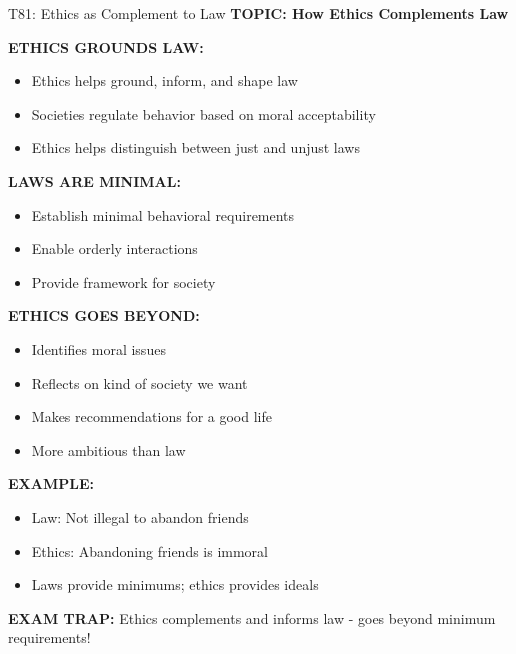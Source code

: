 \documentclass[8pt]{beamer}
\begin{document}
	\begin{frame}{T81: Ethics as Complement to Law}
		\fontsize{6.5}{7.5}\selectfont
		\textbf{TOPIC: How Ethics Complements Law}
		
		\vspace{0.1cm}
		\textbf{ETHICS GROUNDS LAW:}
		\begin{itemize}
			\item Ethics helps ground, inform, and shape law
			\item Societies regulate behavior based on moral acceptability
			\item Ethics helps distinguish between just and unjust laws
		\end{itemize}
		
		\vspace{0.1cm}
		\textbf{LAWS ARE MINIMAL:}
		\begin{itemize}
			\item Establish minimal behavioral requirements
			\item Enable orderly interactions
			\item Provide framework for society
		\end{itemize}
		
		\vspace{0.1cm}
		\textbf{ETHICS GOES BEYOND:}
		\begin{itemize}
			\item Identifies moral issues
			\item Reflects on kind of society we want
			\item Makes recommendations for a good life
			\item More ambitious than law
		\end{itemize}
		
		\vspace{0.1cm}
		\textbf{EXAMPLE:}
		\begin{itemize}
			\item Law: Not illegal to abandon friends
			\item Ethics: Abandoning friends is immoral
			\item Laws provide minimums; ethics provides ideals
		\end{itemize}
		
		\textcolor{myred}{\textbf{EXAM TRAP:}} Ethics \textcolor{myblue}{complements and informs} law - goes beyond minimum requirements!
	\end{frame}
	
\end{document}
